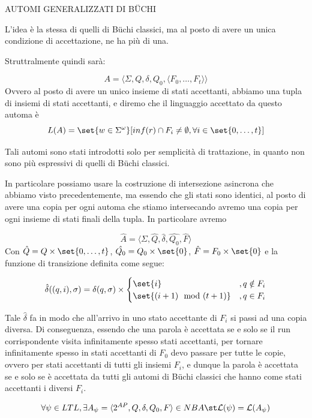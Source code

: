AUTOMI GENERALIZZATI DI BÜCHI

L'idea è la stessa di quelli di Büchi classici, ma al posto di avere un unica condizione di accettazione, ne ha più di una.

Struttralmente quindi sarà:

\[A = \langle\Sigma,Q,\delta,Q_0,\langle F_0, \ldots,F_t\rangle\rangle\]
Ovvero al posto di avere un unico insieme di stati accettanti, abbiamo una tupla di insiemi di stati accettanti, e diremo che il linguaggio accettato da questo automa è
\[L(A)= \set{w\in\Sigma^\omega}[inf(r) \cap F_i \neq \emptyset, \forall i \in \set{0,\ldots,t}]\]

Tali automi sono stati introdotti solo per semplicità di trattazione, in quanto non sono più espressivi di quelli di Büchi classici.

In particolare possiamo usare la costruzione di intersezione asincrona che abbiamo visto precedentemente, ma essendo che gli stati sono identici, al posto di avere una copia per ogni automa che stiamo intersecando avremo una copia per ogni insieme di stati finali della tupla. In particolare avremo

\[\hat{A} = \langle\Sigma, \hat{Q},\hat{\delta},\hat{Q_0},\hat{F}\rangle\]
Con \(\hat{Q}=Q\times\set{0,\ldots,t}\), \(\hat{Q_0}=Q_0\times\set{0}\), \(\hat{F}=F_0\times\set{0}\) e la funzione di transizione definita come segue:

\[\hat{\delta}((q,i),\sigma) = \delta(q,\sigma) \times \begin{cases}
    \set{i}                & ,q\notin F_i \\
    \set{(i+1) \mod (t+1)} & ,q\in F_i
  \end{cases}\]

Tale \(\hat{\delta}\) fa in modo che all'arrivo in uno stato accettante di \(F_i\) si passi ad una copia diversa. Di conseguenza, essendo che una parola è accettata se e solo se il run corrispondente visita infinitamente spesso stati accettanti, per tornare infinitamente spesso in stati accettanti di \(F_0\) devo passare per tutte le copie, ovvero per stati accettanti di tutti gli insiemi \(F_i\), e dunque la parola è accettata se e solo se è accettata da tutti gli automi di Büchi classici che hanno come stati accettanti i diversi \(F_i\).

\begin{theorem}{}
  \[\forall \psi \in LTL, \exists A_\psi = \langle 2^{AP}, Q, \delta,Q_0,F\rangle \in NBA \st \mathcal{L}(\psi) = \mathcal{L}(A_\psi)\]
\end{theorem}

